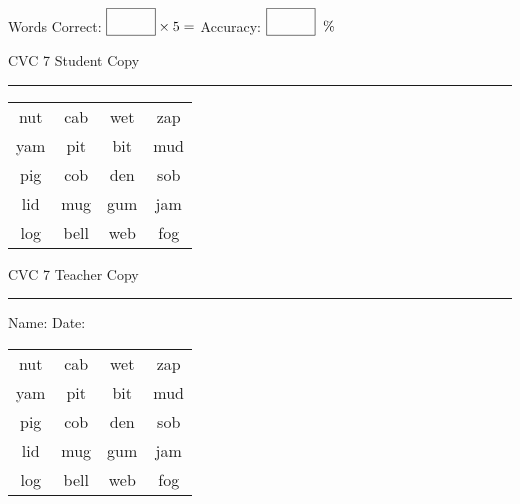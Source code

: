 \documentclass{memoir}
\begin{document}
\small

Words Correct: $\fbox{\phantom{\huge 100}} \times 5 = $ Accuracy: $\fbox{\phantom{\huge 100}}\;\; \%$ 

\vfill

\newpage


\footnotesize \noindent
CVC 7 \hfill Student Copy
\smallskip
\hrule

\Large

\setlength{\tabcolsep}{14pt}
\def\arraystretch{2}

{\selectfont


\begin{vplace}[0.5]
\begin{center}
\begin{tabular}{cccc}
nut & cab & wet & zap \\
yam & pit & bit & mud \\
pig & cob & den & sob \\
lid & mug & gum  & jam \\
log & bell & web & fog \\
\end{tabular}
\end{center}
\end{vplace}

}

\newpage

\footnotesize \noindent
CVC 7 \hfill Teacher Copy
\smallskip
\hrule

\small

\vfill

\noindent
Name: \underline{\hspace{1.75in}} \hfill Date: \underline{\hspace{1in}}

\Large

{\selectfont


\begin{vplace}[0.5]
\begin{center}
\begin{tabular}{cccc}
nut & cab & wet & zap \\
yam & pit & bit & mud \\
pig & cob & den & sob \\
lid & mug & gum  & jam \\
log & bell & web & fog \\
\end{tabular}
\end{center}
\end{vplace}



}
\end{document}
